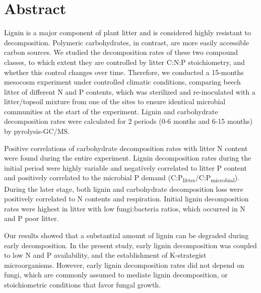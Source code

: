 \section*{Abstract}

Lignin is a major component of plant litter and is considered highly resistant to decomposition. Polymeric carbohydrates, in contrast, are more easily accessible carbon sources. We studied the decomposition rates of these two compound classes, to which extent they are controlled by litter C:N:P stoichiometry, and whether this control changes over time. Therefore, we conducted a 15-months mesocosm experiment under controlled climatic conditions, comparing beech litter of different N and P contents, which was sterilized and re-inoculated with a litter/topsoil mixture from one of the sites to ensure identical microbial communities at the start of the experiment. Lignin and carbohydrate decomposition rates were calculated for 2 periods (0-6 months and 6-15 months) by pyrolysis-GC/MS.

Positive correlations of carbohydrate decomposition rates with litter N content were found during the entire experiment. Lignin decomposition rates during the initial period were highly variable and negatively correlated to litter P content and positively correlated to the microbial P demand (C:P\textsubscript{litter}/C:P\textsubscript{microbial}). During the later stage, both lignin and carbohydrate decomposition loss were positively correlated to N contents and respiration. Initial lignin decomposition rates were highest in litter with low fungi:bacteria ratios, which occurred in N and P poor litter.

Our results showed that a substantial amount of lignin can be degraded during early decomposition. In the present study, early lignin decomposition was coupled to low N and P availability, and the establishment of K-strategist microorganisms. However, early lignin decomposition rates did not depend on fungi, which are commonly assumed to mediate lignin decomposition, or stoichiometric conditions that favor fungal growth. 
